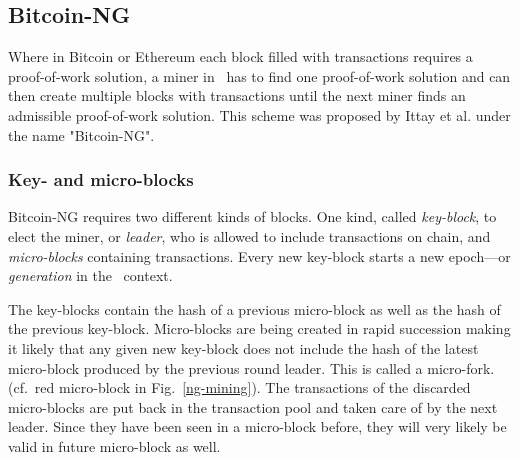 
\subsection{Bitcoin-NG}

Where in Bitcoin or Ethereum each block filled with transactions requires
a proof-of-work solution, a miner in \aet\ has to find one proof-of-work
solution and can then create multiple blocks with transactions until the next
miner finds an admissible proof-of-work solution. This scheme was proposed by
Ittay et al. \cite{Eyal:2016:BSB:2930611.2930615} under the name "Bitcoin-NG".

\subsubsection{Key- and micro-blocks}

Bitcoin-NG requires two different kinds of blocks. One kind, called
\textit{key-block}, to elect the miner, or \textit{leader}, who is allowed to
include transactions on chain, and \textit{micro-blocks} containing
transactions. Every new key-block starts a new epoch---or \textit{generation}
in the \aet\ context.

The key-blocks contain the hash of a previous micro-block as well as the hash
of the previous key-block.
Micro-blocks are being created in rapid succession making it likely that any
given new key-block does not include the hash of the latest micro-block
produced by the previous round leader.
This is called a micro-fork. (cf.\ red micro-block in Fig.\
\ref{ng-mining}). The transactions of the discarded micro-blocks are put back
in the transaction pool and taken care of by the next leader. Since they have
been seen in a micro-block before, they will very likely be valid in
future micro-block as well.

